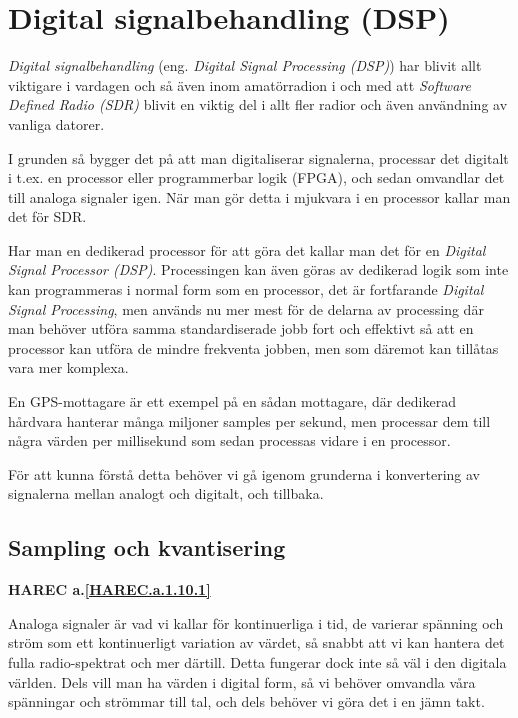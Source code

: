 \section{Digital signalbehandling (DSP)}
\label{DSP}

\emph{Digital signalbehandling} (eng. \emph{Digital Signal Processing (DSP)})
har blivit allt viktigare i vardagen och så även inom amatörradion i och med
att \emph{Software Defined Radio (SDR)} blivit en viktig del i allt fler
radior och även användning av vanliga datorer.

I grunden så bygger det på att man digitaliserar signalerna, processar det
digitalt i t.ex. en processor eller programmerbar logik (FPGA), och sedan
omvandlar det till analoga signaler igen.
När man gör detta i mjukvara i en processor kallar man det för SDR.

Har man en dedikerad processor för att göra det kallar man det för en
\emph{Digital Signal Processor (DSP)}.
Processingen kan även göras av dedikerad logik som inte kan programmeras i
normal form som en processor, det är fortfarande
\emph{Digital Signal Processing}, men används nu mer mest för de delarna av
processing där man behöver utföra samma standardiserade jobb fort och effektivt
så att en processor kan utföra de mindre frekventa jobben, men som däremot kan
tillåtas vara mer komplexa.

En GPS-mottagare är ett exempel på en sådan mottagare, där dedikerad hårdvara
hanterar många miljoner samples per sekund, men processar dem till några värden
per millisekund som sedan processas vidare i en processor.

För att kunna förstå detta behöver vi gå igenom grunderna i konvertering av
signalerna mellan analogt och digitalt, och tillbaka.

\subsection{Sampling och kvantisering}
\textbf{HAREC a.\ref{HAREC.a.1.10.1}\label{myHAREC.a.1.10.1}}

Analoga signaler är vad vi kallar för kontinuerliga i tid, de varierar spänning
och ström som ett kontinuerligt variation av värdet, så snabbt att vi kan
hantera det fulla radio-spektrat och mer därtill.
Detta fungerar dock inte så väl i den digitala världen.
Dels vill man ha värden i digital form, så vi behöver omvandla våra spänningar
och strömmar till tal, och dels behöver vi göra det i en jämn takt.

